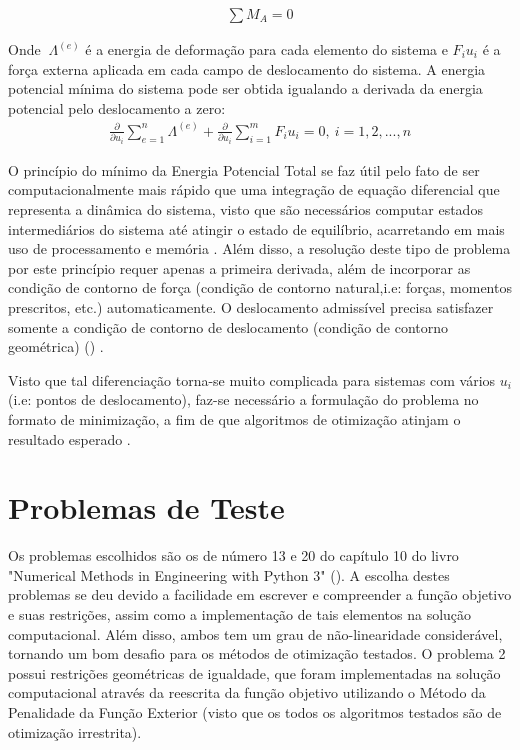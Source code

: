 \documentclass{article}
\begin{document}
\begin{equation}
\begin{split}
\sum M_{A} = 0
\end{split}
\end{equation}


Onde $\ \Lambda^{(e)}$ é a energia de deformação para cada elemento do sistema e $F_i u_i$ é a força externa aplicada em cada campo de deslocamento do sistema.\newline
A energia potencial mínima do sistema pode ser obtida igualando a derivada da energia potencial pelo deslocamento a zero:
\begin{equation}
\begin{split}
\frac{\partial}{\partial u_i} \sum_{e=1}^n \Lambda^{(e)} + \frac{\partial}{\partial u_i} \sum_{i=1}^{m} F_i u_i = 0,\ i=1,2, ..., n
\end{split}
\end{equation}


O princípio do mínimo da Energia Potencial Total se faz útil pelo fato de ser computacionalmente mais rápido que uma integração de equação diferencial que representa a dinâmica do sistema, visto que são necessários computar estados intermediários do sistema até atingir o estado de equilíbrio, acarretando em mais uso de processamento e memória \cite{schlick1987powerful}. Além disso, a resolução deste tipo de problema por este princípio requer apenas a primeira derivada, além de incorporar as condição de contorno de força (condição de contorno natural,i.e: forças, momentos prescritos, etc.) automaticamente. O deslocamento
admissível precisa satisfazer somente a condição de contorno de deslocamento (condição de contorno geométrica) (\cite{hill1959some}) . \newline

Visto que tal diferenciação torna-se muito complicada para sistemas com vários $u_i$ (i.e: pontos de deslocamento), faz-se necessário a formulação do problema no formato de minimização, a fim de que algoritmos de otimização atinjam o resultado esperado \cite{felippa1977numerical}.

\section{Problemas de Teste}
Os problemas escolhidos são os de número 13 e 20 do capítulo 10 do livro "Numerical Methods in Engineering with Python 3" (\cite{kiusalaas2013numerical}). A escolha destes problemas se deu devido a facilidade em escrever e compreender a função objetivo e suas restrições, assim como a implementação de tais elementos na solução computacional. Além disso, ambos tem um grau de não-linearidade considerável, tornando um bom desafio para os métodos de otimização testados.\newline
O problema 2 possui restrições geométricas de igualdade, que foram implementadas na solução computacional através da reescrita da função objetivo utilizando o Método da Penalidade da Função Exterior (visto que os todos os algoritmos testados são de otimização irrestrita).
\end{document}
